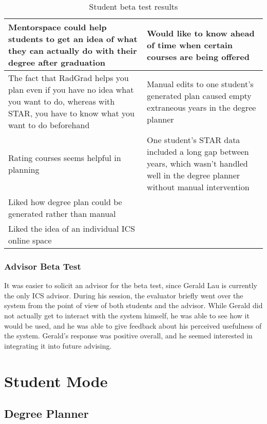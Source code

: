 \begin{table}[h!]
\begin{tabular}{ |p{8cm}|p{8cm}|}
 \hline
Mentorspace could help students to get an idea of what they can actually do with their degree after graduation &Would like to know ahead of time when certain courses are being offered\\
 \hline
The fact that RadGrad helps you plan even if you have no idea what you want to do, whereas with STAR, you have to know what you want to do beforehand & Manual edits to one student's generated plan caused empty extraneous years in the degree planner\\
 \hline
Rating courses seems helpful in planning & One student's STAR data included a long gap between years, which wasn't handled well in the degree planner without manual intervention\\
 \hline
Liked how degree plan could be generated rather than manual &\\
 \hline
Liked the idea of an individual ICS online space &\\
 \hline
\end{tabular}
\caption{Student beta test results}
\label{table:3}
\end{table}

\subsubsection{Advisor Beta Test}
It was easier to solicit an advisor for the beta test, since Gerald Lau is currently the only ICS advisor. During his session, the evaluator briefly went over the system from the point of view of both students and the advisor. While Gerald did not actually get to interact with the system himself, he was able to see how it would be used, and he was able to give feedback about his perceived usefulness of the system. Gerald's response was positive overall, and he seemed interested in integrating it into future advising.
\section{Student Mode}
\subsection{Degree Planner}
